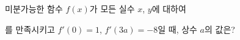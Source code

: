 미분가능한 함수 $f(x)$가 모든 실수 $x$, $y$에 대하여\par\smallskip{}\par\smallskip\noindent 를 만족시키고 $f'(0)=1$, $f'(3a)=-8$일 때, 상수 $a$의 값은?
